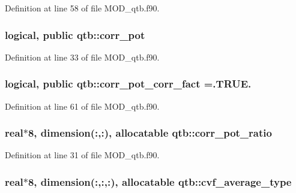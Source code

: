 Definition at line 58 of file M\-O\-D\-\_\-qtb.\-f90.

\hypertarget{classqtb_a617a1a716e7599e62eca164178f38df2}{
\subsubsection[{corr\-\_\-pot}]{\setlength{\rightskip}{0pt plus 5cm}logical, public qtb\-::corr\-\_\-pot}}\label{classqtb_a617a1a716e7599e62eca164178f38df2}


Definition at line 33 of file M\-O\-D\-\_\-qtb.\-f90.

\hypertarget{classqtb_a98327ca14b7917a2e422f898e0b57eb7}{
\subsubsection[{corr\-\_\-pot\-\_\-corr\-\_\-fact}]{\setlength{\rightskip}{0pt plus 5cm}logical, public qtb\-::corr\-\_\-pot\-\_\-corr\-\_\-fact =.T\-R\-U\-E.}}\label{classqtb_a98327ca14b7917a2e422f898e0b57eb7}


Definition at line 61 of file M\-O\-D\-\_\-qtb.\-f90.

\hypertarget{classqtb_aa29c1c8fec4a13230ea627fbd6962a10}{
\subsubsection[{corr\-\_\-pot\-\_\-ratio}]{\setlength{\rightskip}{0pt plus 5cm}real$\ast$8, dimension(\-:,\-:), allocatable qtb\-::corr\-\_\-pot\-\_\-ratio}}\label{classqtb_aa29c1c8fec4a13230ea627fbd6962a10}


Definition at line 31 of file M\-O\-D\-\_\-qtb.\-f90.

\hypertarget{classqtb_a036c37b3c6b63524318c5965fa33c003}{
\subsubsection[{cvf\-\_\-average\-\_\-type}]{\setlength{\rightskip}{0pt plus 5cm}real$\ast$8, dimension(\-:,\-:,\-:), allocatable qtb\-::cvf\-\_\-average\-\_\-type}}\label{classqtb_a036c37b3c6b63524318c5965fa33c003}


